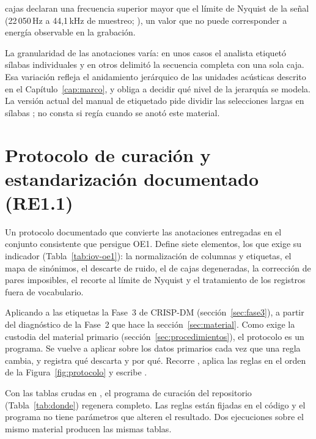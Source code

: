  \nNyquist{} cajas declaran una
frecuencia superior mayor que el límite de Nyquist de la señal (22\,050\,Hz a
44,1\,kHz de muestreo; \citealp{shannon_communication_1949}), un valor que no puede corresponder a energía observable
en la grabación.

 La granularidad de las
anotaciones varía: en unos casos el analista etiquetó sílabas individuales y en
otros delimitó la secuencia completa con una sola caja. Esa variación refleja el
anidamiento jerárquico de las unidades acústicas \citep{kershenbaum_acoustic_2016} descrito en el
Capítulo~\ref{cap:marco}, y obliga a decidir qué nivel de la jerarquía se
modela. La versión actual del manual de etiquetado pide dividir las selecciones
largas en sílabas \citep{proyecto8_manual_2025}; no consta si regía cuando se anotó este material.

\section{Protocolo de curación y estandarización documentado (RE1.1)}
\label{sec:re11}
\label{sec:protocolo}

 Un protocolo documentado que convierte las anotaciones
entregadas en el conjunto consistente que persigue OE1. Define siete elementos,
los que exige su indicador (Tabla~\ref{tab:iov-oe1}): la normalización de columnas
y etiquetas, el mapa de sinónimos, el descarte de ruido, el de cajas degeneradas, la
corrección de pares imposibles, el recorte al límite de Nyquist y el tratamiento
de los registros fuera de vocabulario.

 Aplicando a las etiquetas la Fase~3 de CRISP-DM
(sección~\ref{sec:fase3}), a partir del diagnóstico de la Fase~2 que hace la
sección~\ref{sec:material}. Como exige la custodia del material primario
(sección~\ref{sec:procedimientos}), el protocolo es un programa. Se vuelve a
aplicar sobre los datos primarios cada vez que una regla cambia, y registra qué
descarta y por qué. Recorre , aplica las reglas en el orden de la
Figura~\ref{fig:protocolo} y escribe .

 Con las tablas crudas en , el
programa de curación del repositorio (Tabla~\ref{tab:donde}) regenera
 completo. Las reglas están fijadas en el código y el
programa no tiene parámetros que alteren el resultado. Dos ejecuciones sobre el
mismo material producen las mismas tablas.


